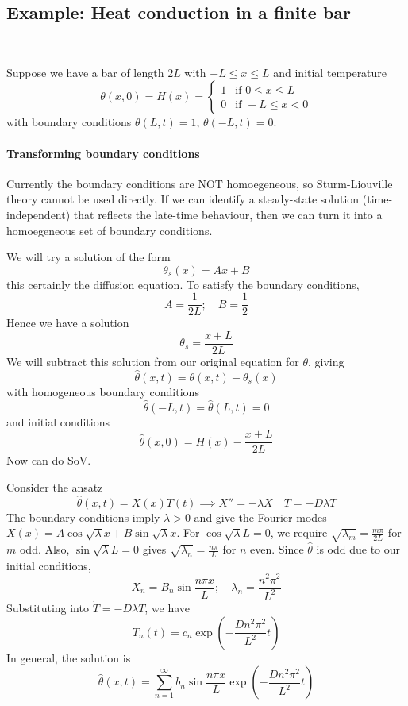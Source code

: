 \documentclass[a4paper]{article}
\begin{document}
\subsection{Example: Heat conduction in a finite bar}\ \vspace{-1.5em}
\begin{example}
    Suppose we have a bar of length \( 2L \) with \( -L \leq x \leq L \) and initial temperature
\[
	\theta(x,0) = H(x) = \begin{cases}
		1 & \text{if } 0 \leq x \leq L \\
		0 & \text{if } -L \leq x < 0
	\end{cases}
\]
with boundary conditions \( \theta(L, t) = 1 \), \( \theta(-L, t) = 0 \).
\end{example}

\paragraph{Transforming boundary conditions} Currently the boundary conditions are NOT homoegeneous, so Sturm-Liouville theory cannot be used directly.
If we can identify a steady-state solution (time-independent) that reflects the late-time behaviour, then we can turn it into a homoegeneous set of boundary conditions.


We will try a solution of the form
\[
	\theta_s(x) = Ax + B
\]
this certainly the diffusion equation.
To satisfy the boundary conditions,
\[
	A = \frac{1}{2L};\quad B = \frac{1}{2}
\]
Hence we have a solution
\[
	\theta_s = \frac{x + L}{2L}
\]
We will subtract this solution from our original equation for \( \theta \), giving
\[
	\hat \theta(x,t) = \theta(x,t) - \theta_s(x)
\]
with homogeneous boundary conditions
\[
	\hat \theta(-L, t) = \hat \theta(L, t) = 0
\]
and initial conditions
\[
	\hat \theta(x,0) = H(x) - \frac{x+L}{2L}
\]
Now can do SoV.

Consider the ansatz
\[
	\hat \theta(x,t) = X(x) T(t) \implies X'' = - \lambda X\quad \dot T = -D \lambda T
\]
The boundary conditions imply \( \lambda > 0 \) and give the Fourier modes \( X(x) = A \cos \sqrt{\lambda} x + B \sin \sqrt{\lambda} x \).
For \( \cos \sqrt{\lambda} L = 0 \), we require \( \sqrt{\lambda_m} = \frac{m \pi}{2L} \) for \( m \) odd.
Also, \( \sin \sqrt{\lambda} L = 0 \) gives \( \sqrt{\lambda_n} = \frac{n \pi}{L} \) for \( n \) even.
Since \( \hat \theta \) is odd due to our initial conditions,
\[
	X_n = B_n \sin \frac{n \pi x}{L}; \quad \lambda_n = \frac{n^2 \pi^2}{L^2}
\]
Substituting into \( \dot T = -D \lambda T \), we have
\[
	T_n(t) = c_n \exp(-\frac{Dn^2 \pi^2}{L^2} t )
\]
In general, the solution is
\[
	\hat \theta(x,t) = \sum_{n=1}^\infty b_n \sin \frac{n \pi x}{L} \exp(-\frac{Dn^2 \pi^2}{L^2} t )
\]
\end{document}
